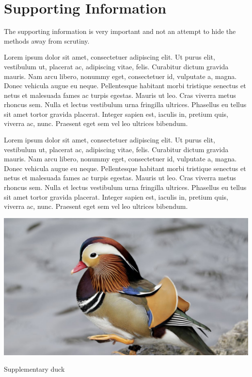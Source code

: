 \documentclass[twocolumn, switch]{article} %
\begin{document}
\normalsize

\begin{refcontext}[sorting=nyt]
\printbibliography
\end{refcontext}

\clearpage 

\section*{Supporting Information}

The supporting information is very important and not an attempt to hide the methods away from scrutiny. 

Lorem ipsum dolor sit amet, consectetuer adipiscing elit. Ut purus elit, vestibulum ut, placerat ac, adipiscing vitae, felis. Curabitur dictum gravida mauris. Nam arcu libero, nonummy eget, consectetuer id, vulputate a, magna. Donec vehicula augue eu neque. Pellentesque habitant morbi tristique senectus et netus et malesuada fames ac turpis egestas. Mauris ut leo. Cras viverra metus rhoncus sem. Nulla et lectus vestibulum urna fringilla ultrices. Phasellus eu tellus sit amet tortor gravida placerat. Integer sapien est, iaculis in, pretium quis, viverra ac, nunc. Praesent eget sem vel leo ultrices bibendum.

Lorem ipsum dolor sit amet, consectetuer adipiscing elit. Ut purus elit, vestibulum ut, placerat ac, adipiscing vitae, felis. Curabitur dictum gravida mauris. Nam arcu libero, nonummy eget, consectetuer id, vulputate a, magna. Donec vehicula augue eu neque. Pellentesque habitant morbi tristique senectus et netus et malesuada fames ac turpis egestas. Mauris ut leo. Cras viverra metus rhoncus sem. Nulla et lectus vestibulum urna fringilla ultrices. Phasellus eu tellus sit amet tortor gravida placerat. Integer sapien est, iaculis in, pretium quis, viverra ac, nunc. Praesent eget sem vel leo ultrices bibendum.

\begin{suppfigure*}
  \includegraphics[scale=0.5]{duck2.jpg}
  \centering
  \caption{Supplementary duck}
  \label{fig:SI_1}
\end{suppfigure*}

\end{document}
